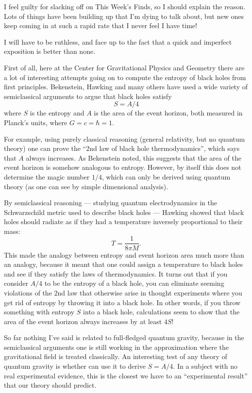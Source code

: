 \documentclass{article}
\begin{document}
I feel guilty for slacking off on This Week's Finds, so I should explain
the reason. Lots of things have been building up that I'm dying to talk
about, but new ones keep coming in at such a rapid rate that I never
feel I have time!

I will have to be ruthless, and face up to the fact that a quick and
imperfect exposition is better than none.

First of all, here at the Center for Gravitational Physics and Geometry
there are a lot of interesting attempts going on to compute the entropy
of black holes from first principles. Bekenstein, Hawking and many
others have used a wide variety of semiclassical arguments to argue that
black holes satisfy \[S = A/4\] where \(S\) is the entropy and \(A\) is
the area of the event horizon, both measured in Planck's units, where
\(G = c = \hbar = 1\).

For example, using purely classical reasoning (general relativity, but
no quantum theory) one can prove the ``2nd law of black hole
thermodynamics'', which says that \(A\) always increases. As Bekenstein
noted, this suggests that the area of the event horizon is somehow
analogous to entropy. However, by itself this does not determine the
magic number \(1/4\), which can only be derived using quantum theory (as
one can see by simple dimensional analysis).

By semiclassical reasoning --- studying quantum electrodynamics in the
Schwarzschild metric used to describe black holes --- Hawking showed
that black holes should radiate as if they had a temperature inversely
proportional to their mass: \[T = \frac{1}{8\pi M}.\] This made the
analogy between entropy and event horizon area much more than an
analogy, because it meant that one could assign a temperature to black
holes and see if they satisfy the laws of thermodynamics. It turns out
that if you consider \(A/4\) to be the entropy of a black hole, you can
eliminate seeming violations of the 2nd law that otherwise arise in
thought experiments where you get rid of entropy by throwing it into a
black hole. In other words, if you throw something with entropy \(S\)
into a black hole, calculations seem to show that the area of the event
horizon always increases by at least \(4S\)!

So far nothing I've said is related to full-fledged quantum gravity,
because in the semiclassical arguments one is still working in the
approximation where the gravitational field is treated classically. An
interesting test of any theory of quantum gravity is whether can use it
to derive \(S = A/4\). In a subject with no real experimental evidence,
this is the closest we have to an ``experimental result'' that our
theory should predict.
\end{document}
